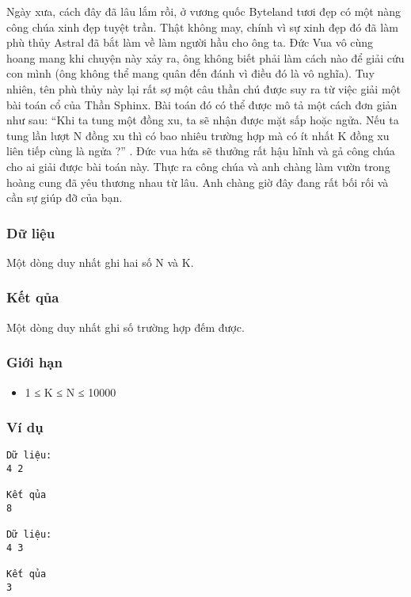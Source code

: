 



   Ngày xưa, cách đây đã lâu lắm rồi, ở vương quốc Byteland tươi đẹp có một nàng công chúa xinh đẹp tuyệt trần. Thật không may, chính vì sự xinh   đẹp đó đã làm phù thủy Astral đã bắt làm về làm người hầu cho ông ta. Đức Vua vô cùng hoang mang khi chuyện này xảy ra, ông không biết phải làm   cách nào để giải cứu con mình (ông không thể mang quân đến đánh vì điều đó là vô nghĩa). Tuy nhiên, tên phù thủy này lại rất sợ một câu thần chú được   suy ra từ việc giải một bài toán cổ của Thần Sphinx. Bài toán đó có thể được mô tả một cách đơn giản như sau: “Khi ta tung một đồng xu, ta sẽ nhận   được mặt sấp hoặc ngửa. Nếu ta tung lần lượt N đồng xu thì có bao nhiêu trường hợp mà có ít nhất K đồng xu liên tiếp cùng là ngửa ?” . Đức vua hứa   sẽ thưởng rất hậu hĩnh và gả công chúa cho ai giải được bài toán này. Thực ra công chúa và anh chàng làm vườn trong hoàng cung đã yêu thương nhau   từ lâu. Anh chàng giờ đây đang rất bối rối và cần sự giúp đỡ của bạn.  

\subsubsection{   Dữ liệu  }

   Một dòng duy nhất ghi hai số N và K.  

\subsubsection{   Kết qủa  }

   Một dòng duy nhất ghi số trường hợp đếm được.  

\subsubsection{   Giới hạn  }
\begin{itemize}
	\item     1 ≤ K ≤  N ≤ 10000   
\end{itemize}

\subsubsection{   Ví dụ  }
\begin{verbatim}
Dữ liệu:
4 2

Kết qủa
8

Dữ liệu:
4 3

Kết qủa
3
\end{verbatim}